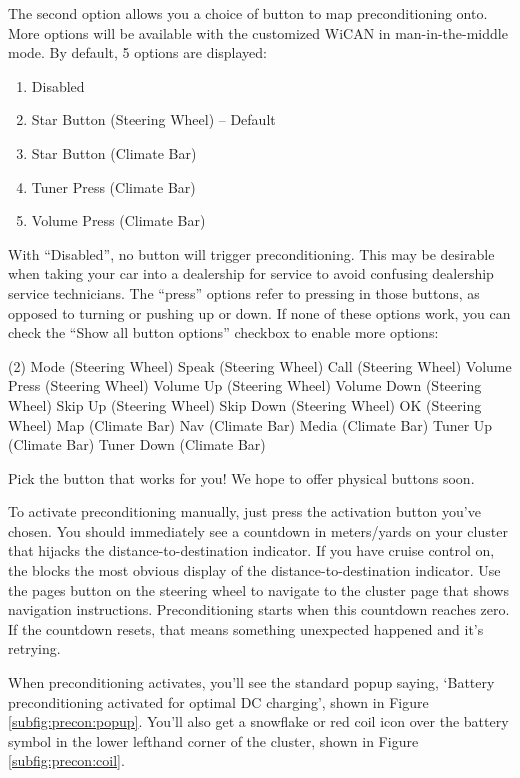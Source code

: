 \documentclass[superscriptaddress,onecolumn,floatfix]{revtex4-2}
\begin{document}
The second option allows you a choice of button to map preconditioning onto. More options will be available with the customized WiCAN in man-in-the-middle mode. By default, 5 options are displayed:
\begin{enumerate}
  \item Disabled
  \item Star Button (Steering Wheel) -- Default
  \item Star Button (Climate Bar)
  \item Tuner Press (Climate Bar)
  \item Volume Press (Climate Bar)
\end{enumerate}
With ``Disabled'', no button will trigger preconditioning. This may be desirable when taking your car into a dealership for service to avoid confusing dealership service technicians. The ``press'' options refer to pressing in those buttons, as opposed to turning or pushing up or down. If none of these options work, you can check the ``Show all button options'' checkbox to enable more options:
\begin{tasks}(2)
  \task Mode (Steering Wheel)
  \task Speak (Steering Wheel)
  \task Call (Steering Wheel)
  \task Volume Press (Steering Wheel)
  \task Volume Up (Steering Wheel)
  \task Volume Down (Steering Wheel)
  \task Skip Up (Steering Wheel)
  \task Skip Down (Steering Wheel)
  \task OK (Steering Wheel)
  \task Map (Climate Bar)
  \task Nav (Climate Bar)
  \task Media (Climate Bar)
  \task Tuner Up (Climate Bar)
  \task Tuner Down (Climate Bar)
\end{tasks}
Pick the button that works for you! We hope to offer physical buttons soon.

To activate preconditioning manually, just press the activation button you've chosen. You should immediately see a countdown in meters/yards on your cluster that hijacks the distance-to-destination indicator. If you have cruise control on, the blocks the most obvious display of the distance-to-destination indicator. Use the pages button on the steering wheel to navigate to the cluster page that shows navigation instructions. Preconditioning starts when this countdown reaches zero. If the countdown resets, that means something unexpected happened and it's retrying. 

When preconditioning activates, you'll see the standard popup saying, `Battery preconditioning activated for optimal DC charging', shown in Figure \ref{subfig:precon:popup}. You'll also get a snowflake or red coil icon over the battery symbol in the lower lefthand corner of the cluster, shown in Figure \ref{subfig:precon:coil}.
\end{document}
